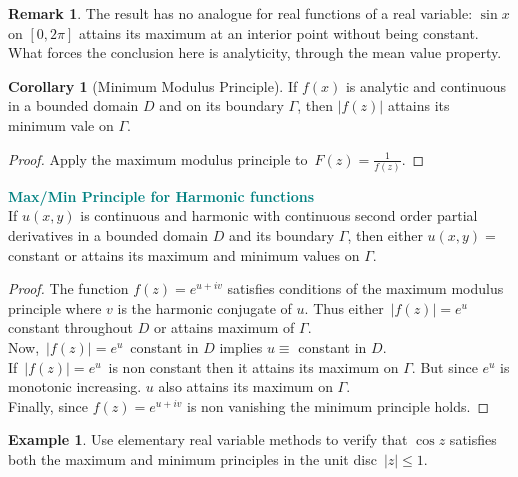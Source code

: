 \documentclass[11pt,a4paper]{article}
\theoremstyle{definition}
\newtheorem{example}[thm]{Example}
\newtheorem{remark}[thm]{Remark}
\newtheorem{corollary}[thm]{Corollary}
\begin{document}
\begin{remark}
The result has no analogue for real functions of a real variable: $\sin x$ on
$[0,2\pi]$ attains its maximum at an interior point without being constant.
What forces the conclusion here is analyticity, through the mean value
property.
\end{remark}







\begin{corollary}[Minimum Modulus Principle]
If $f(x)$ is analytic and continuous in a bounded domain $D$ and on its boundary $\Gamma$, then $\left|f(z)\right|$ attains its minimum vale on $\Gamma$.
\end{corollary}

\begin{proof}
Apply the maximum modulus principle to $\, F(z) = \frac{1}{f(z)}$.
\end{proof}

\textbf{\textcolor{teal}{Max/Min Principle for Harmonic functions}}\\
If $u(x,y)$ is continuous and harmonic with continuous second order partial derivatives in a bounded domain $D$ and its boundary $\Gamma$, then either $u(x,y) = $ constant or attains its maximum and minimum values on $\Gamma$.\\


\begin{proof}
The function $f(z) = e^{u + iv}$ satisfies conditions of the maximum modulus principle where $v$ is the harmonic conjugate of $u$. Thus either $\, \left|f(z)\right| = e^u\,$ constant throughout $D$ or attains maximum of $\Gamma$.\\
Now, $\, \left|f(z)\right| = e^u\,$ constant in $D$ implies $u\equiv$ constant in $D$.\\
If $\, \left|f(z)\right| = e^u\,$ is non constant then it attains its maximum on $\Gamma$. But since $e^u$ is monotonic increasing. $u$ also attains its maximum on $\Gamma$.\\
Finally, since $f(z) = e^{u + iv}$ is non vanishing the minimum principle holds.
\end{proof}

\begin{example}
Use elementary real variable methods to verify that $\cos z$ satisfies both the maximum and minimum principles in the unit disc $\, \left|z\right| \leq 1$.
\end{example}
\end{document}
